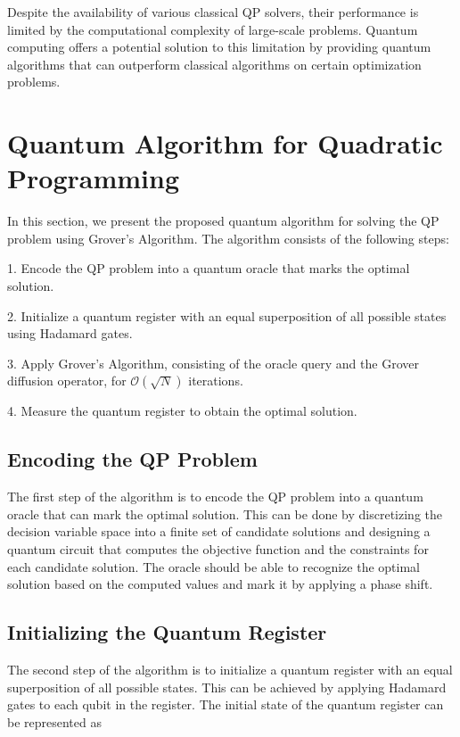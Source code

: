 Despite the availability of various classical QP solvers, their performance is limited by the computational complexity of large-scale problems. Quantum computing offers a potential solution to this limitation by providing quantum algorithms that can outperform classical algorithms on certain optimization problems.

\section{Quantum Algorithm for Quadratic Programming}
\label{sec:algorithm}

In this section, we present the proposed quantum algorithm for solving the QP problem using Grover's Algorithm. The algorithm consists of the following steps:

1. Encode the QP problem into a quantum oracle that marks the optimal solution.

2. Initialize a quantum register with an equal superposition of all possible states using Hadamard gates.

3. Apply Grover's Algorithm, consisting of the oracle query and the Grover diffusion operator, for $\mathcal{O}(\sqrt{N})$ iterations.

4. Measure the quantum register to obtain the optimal solution.

\subsection{Encoding the QP Problem}

The first step of the algorithm is to encode the QP problem into a quantum oracle that can mark the optimal solution. This can be done by discretizing the decision variable space into a finite set of candidate solutions and designing a quantum circuit that computes the objective function and the constraints for each candidate solution. The oracle should be able to recognize the optimal solution based on the computed values and mark it by applying a phase shift.

\subsection{Initializing the Quantum Register}

The second step of the algorithm is to initialize a quantum register with an equal superposition of all possible states. This can be achieved by applying Hadamard gates to each qubit in the register. The initial state of the quantum register can be represented as

